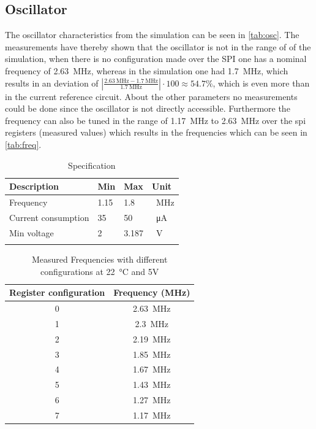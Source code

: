 \subsection{Oscillator}
\label{subsubsec:oscillator}
The oscillator characteristics from the simulation can be seen in \autoref{tab:osc}. The measurements have thereby shown that the oscillator is not in the range of of the simulation, when there is no configuration made over the SPI one has a nominal frequency of \qty{2.63}{\mega\hertz}, whereas in the simulation one had \qty{1.7}{\mega\hertz}, which results in an deviation of $\left|\frac{\qty{2.63}{\mega\hertz}-\qty{1.7}{\mega\hertz}}{\qty{1.7}{\mega\hertz}}\right|\cdot 100\approx 54.7 \%$, which is even more than in the current reference circuit. About the other parameters no measurements could be done since the oscillator is not directly accessible. Furthermore the frequency can also be tuned in the range of \qty{1.17}{\mega\hertz} to \qty{2.63}{\mega\hertz} over the spi registers (measured values) which results in the frequencies which can be seen in \autoref{tab:freq}. 
\begin{longtable}{|p{3.5cm}|p{3.5cm}|p{3.5cm}|p{3.5cm}|}
	\hline
	\rowcolor{lightgray}
	\textbf{Description} &\textbf{Min} &\textbf{Max} & \textbf{Unit} \\ \hline
	
	Frequency & 1.15 & 1.8 &\qty{}{\mega\hertz} \\ \hline
	Current consumption & 35 & 50 & \qty{}{\micro\ampere} \\ \hline
	Min voltage & 2& 3.187 & \qty{}{\volt} \\ \hline
	\caption{Specification} %
	\label{tab:osc}
\end{longtable}
\begin{table}[h]
	\centering
	\begin{tabular}{|c|c|}
		\hline
		\rowcolor{lightgray}
		Register configuration & Frequency (MHz) \\
		\hline
		0 & \qty{2.63}{\mega\hertz} \\
		\hline
		1 & \qty{2.3}{\mega\hertz} \\
		\hline
		2 & \qty{2.19}{\mega\hertz} \\
		\hline
		3 & \qty{1.85}{\mega\hertz} \\
		\hline
		4 & \qty{1.67}{\mega\hertz} \\
		\hline
		5 & \qty{1.43}{\mega\hertz} \\
		\hline
		6 & \qty{1.27}{\mega\hertz} \\
		\hline
		7 & \qty{1.17}{\mega\hertz} \\
		\hline
	\end{tabular}
	\caption{Measured Frequencies with different configurations at \qty{22}{\degreeCelsius} and 5V}
	\label{tab:freq}
\end{table}


